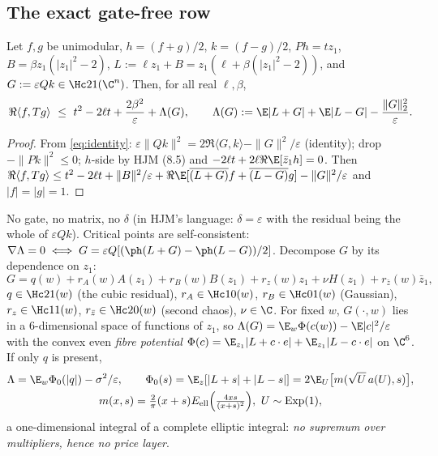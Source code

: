 \subsection{The exact gate-free row}\label{sec:exactrow}
\begin{proposition}\label{prop:row}
Let $f,g$ be unimodular, $h=(f+g)/2$, $k=(f-g)/2$, $Ph=tz_1$, $B=\beta z_1(|z_1|^2-2)$, $L:=\ell z_1+B=z_1(\ell+\beta(|z_1|^2-2))$, and
$G:=\varepsilon Qk\in\Hc21(\C^n)$. Then, for all real $\ell,\beta$,
\[
\Re\langle f,Tg\rangle\ \le\ t^2-2\ell t+\frac{2\beta^2}\varepsilon+\Lambda(G),\qquad
\Lambda(G):=\E|L+G|+\E|L-G|-\frac{\|G\|_2^2}\varepsilon .
\]
\end{proposition}
\begin{proof}
From \eqref{eq:identity}: $\varepsilon\|Qk\|^2=2\Re\langle G,k\rangle-\|G\|^2/\varepsilon$ (identity); drop $-\|Pk\|^2\le0$; $h$-side by HJM (8.5) and
$-2\ell t+2\ell\Re\E[\bar z_1h]=0$. Then $\Re\langle f,Tg\rangle\le t^2-2\ell t+\|B\|^2/\varepsilon+\Re\E[\overline{(L+G)}f+\overline{(L-G)}g]-\|G\|^2/\varepsilon$ and
$|f|=|g|=1$.
\end{proof}
No gate, no matrix, no $\delta$ (in HJM's language: $\delta=\varepsilon$ with the residual being the whole of $\varepsilon Qk$). Critical points are
self-consistent: $\nabla\Lambda=0\iff G=\varepsilon Q[(\ph(L+G)-\ph(L-G))/2]$. Decompose $G$ by its dependence on $z_1$:
\[
G=q(w)+r_A(w)A(z_1)+r_B(w)B(z_1)+r_z(w)z_1+\nu H(z_1)+r_{\bar z}(w)\bar z_1,
\]
$q\in\Hc21(w)$ (the cubic residual), $r_A\in\Hc10(w)$, $r_B\in\Hc01(w)$ (Gaussian), $r_z\in\Hc11(w)$, $r_{\bar z}\in\Hc20(w)$ (second chaos), $\nu\in\C$.
For fixed $w$, $G(\cdot,w)$ lies in a 6-dimensional space of functions of $z_1$, so $\Lambda(G)=\E_w\Phi(c(w))-\E|c|^2/\varepsilon$ with the convex even
\emph{fibre potential} $\Phi(c)=\E_{z_1}|L+c\cdot e|+\E_{z_1}|L-c\cdot e|$ on $\C^6$. If only $q$ is present,
\[\begin{gathered}
\Lambda=\E_w\Phi_0(|q|)-\sigma^2/\varepsilon,\qquad \Phi_0(s)=\E_z[|L+s|+|L-s|]=2\E_U\bigl[m(\sqrt U\,a(U),s)\bigr],\\
m(x,s)=\tfrac2\pi(x+s)E_{\rm ell}\Bigl(\tfrac{4xs}{(x+s)^2}\Bigr),\ U\sim\mathrm{Exp}(1),
\end{gathered}\]
a one-dimensional integral of a complete elliptic integral: \emph{no supremum over multipliers, hence no price layer}.


